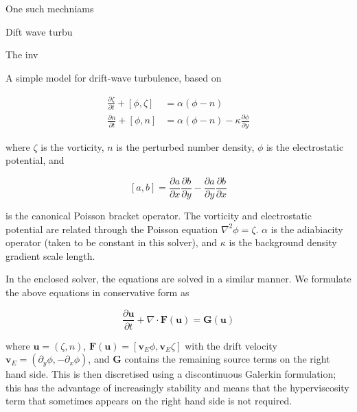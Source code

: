 \documentclass{article}
\begin{document}
One such mechniams 

Dift wave turbu

The inv

A simple model for drift-wave turbulence, based on 

\begin{align*}
  \frac{\partial\zeta}{\partial t} + [\phi, \zeta] &= \alpha (\phi - n) \\
  \frac{\partial n}{\partial t} + [\phi, n] &= \alpha (\phi - n) - \kappa \frac{\partial\phi}{\partial y}
\end{align*}

where $\zeta$ is the vorticity, $n$ is the perturbed number density, $\phi$ is
the electrostatic potential, and

\[
  [a,b] = \frac{\partial a}{\partial x} \frac{\partial b}{\partial y} -
  \frac{\partial a}{\partial y} \frac{\partial b}{\partial x}
\]

is the canonical Poisson bracket operator. The vorticity and electrostatic
potential are related through the Poisson equation $\nabla^2\phi =
\zeta$. $\alpha$ is the adiabiacity operator (taken to be constant in this
solver), and $\kappa$ is the background density gradient scale length.

In the enclosed solver, the equations are solved in a similar manner. We
formulate the above equations in conservative form as

$$ \frac{\partial \mathbf{u}}{\partial t} + \nabla \cdot \mathbf{F}(\mathbf{u}) = \mathbf{G}(\mathbf{u}) $$

where $\mathbf{u} = (\zeta, n)$,
$\mathbf{F}(\mathbf{u}) = [ \mathbf{v}_E \phi, \mathbf{v}_E \zeta ]$ with the
drift velocity $\mathbf{v}_E = (\partial_y \phi, -\partial_x \phi)$, and
$\mathbf{G}$ contains the remaining source terms on the right hand side. This is
then discretised using a discontinuous Galerkin formulation; this has the
advantage of increasingly stability and means that the hyperviscosity term that
sometimes appears on the right hand side is not required.





\end{document}
